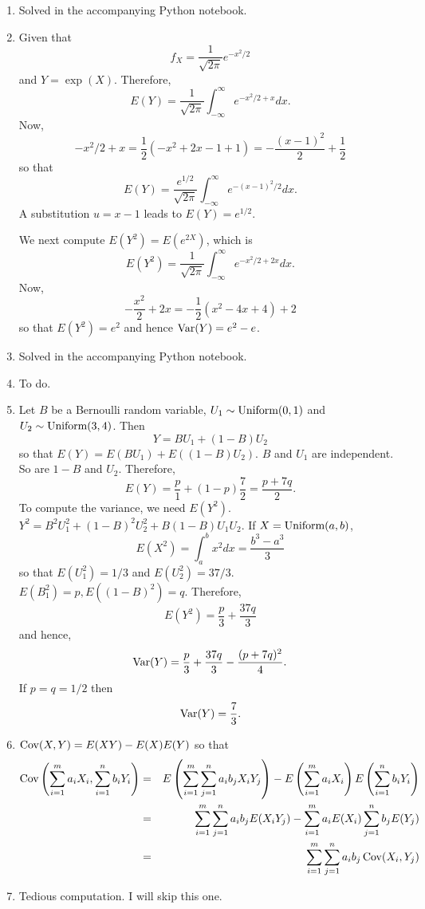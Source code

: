 \documentclass{article}
\begin{document}
\begin{enumerate}
\item Solved in the accompanying Python notebook.

\item Given that 
\[
f_X = \frac{1}{\sqrt{2\pi}}e^{-x^2/2}
\]
and $Y = \exp(X)$. Therefore,
\[
E(Y) = \frac{1}{\sqrt{2\pi}}\int_{-\infty}^\infty e^{-x^2/2 + x} dx.
\]
Now,
\[
-x^2/2 + x = \frac{1}{2}(-x^2 + 2x - 1 + 1) = -\frac{(x-1)^2}{2} + \frac{1}{2}
\]
so that
\[
E(Y) = \frac{e^{1/2}}{\sqrt{2\pi}}\int_{-\infty}^\infty e^{-(x - 1)^2/2}dx.
\]
A substitution $u = x - 1$ leads to $E(Y) = e^{1/2}$.

We next compute $E(Y^2) = E(e^{2X})$, which is
\[
E(Y^2) = \frac{1}{\sqrt{2\pi}}\int_{-\infty}^\infty e^{-x^2/2 + 2x} dx.
\]
Now,
\[
-\frac{x^2}{2} + 2x = -\frac{1}{2}(x^2 - 4x + 4) + 2
\] 
so that $E(Y^2) = e^2$ and hence $\operatorname{Var}(Y) = e^2 - e$.

\item Solved in the accompanying Python notebook.

\item To do.

\item Let $B$ be a Bernoulli random variable, $U_1 \sim \text{Uniform}(0, 1)$ and $U_2 
\sim \text{Uniform}(3, 4)$. Then
\[
Y = BU_1 + (1 - B)U_2
\]
so that $E(Y) = E(BU_1) + E((1 - B)U_2)$. $B$ and $U_1$ are independent. So are
$1 - B$ and $U_2$. Therefore, 
\[
E(Y) = \frac{p}{1} + (1 - p)\frac{7}{2} = \frac{p + 7q}{2}.
\]
To compute the variance, we need $E(Y^2)$. $Y^2 = B^2U_1^2 + (1 - B)^2U_2^2 +
B(1 - B)U_1U_2$. If $X = \text{Uniform}(a, b)$, 
\[
E(X^2) = \int_a^b x^2dx = \frac{b^3 - a^3}{3}
\]
so that $E(U_1^2) = 1/3$ and $E(U_2^2) = 37/3$. $E(B_1^2) = p, E((1 - B)^2) = q$.
Therefore,
\[
E(Y^2) = \frac{p}{3} + \frac{37q}{3}
\]
and hence,
\[
\operatorname{Var}(Y) = \frac{p}{3} + \frac{37q}{3} - \frac{(p + 7q)^2}{4}.
\]
If $p = q = 1/2$ then
\[
\operatorname{Var}(Y) = \frac{7}{3}.
\]

\item $\operatorname{Cov}(X, Y) = E(XY) - E(X)E(Y)$ so that
\begin{eqnarray*}
\operatorname{Cov}\left(\sum_{i=1}^ma_iX_i, \sum_{i=1}^nb_iY_i\right) &=& 
E\left(\sum_{i=1}^m\sum_{j=1}^na_ib_jX_iY_j\right) - 
E\left(\sum_{i=1}^ma_iX_i\right)E\left(\sum_{i=1}^nb_iY_i\right) \\
 &=& \sum_{i=1}^m\sum_{j=1}^na_ib_jE(X_iY_j) - 
 \sum_{i=1}^ma_iE(X_i)\sum_{j=1}^nb_jE(Y_j) \\
 &=& \sum_{i=1}^m\sum_{j=1}^na_ib_j\operatorname{Cov}(X_i, Y_j)
\end{eqnarray*}

\item Tedious computation. I will skip this one.

\end{enumerate}
 
\end{document}

